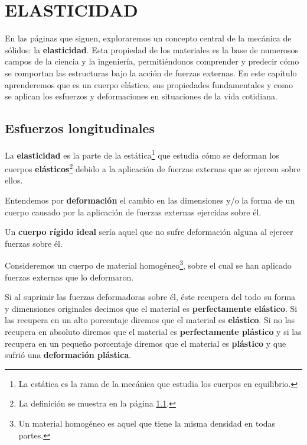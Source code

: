 \cleardoublepage
\chapter[Elasticidad]{ELASTICIDAD}
\startcontents
\printchaptertableofcontents

En las páginas que siguen, exploraremos un concepto central de la mecánica de sólidos: la \textbf{elasticidad}. Esta propiedad de los materiales es la base de numerosos campos de la ciencia y la ingeniería, permitiéndonos comprender y predecir cómo se comportan las estructuras bajo la acción de fuerzas externas. En este capítulo aprenderemos que es un cuerpo elástico, sus propiedades fundamentales y como se aplican los esfuerzos y deformaciones en situaciones de la vida cotidiana.

\section{Esfuerzos longitudinales}

La \textbf{elasticidad} es la parte de la estática\footnote{La estática es la rama de la mecánica que estudia los cuerpos en equilibrio.} que estudia cómo se deforman los cuerpos \textbf{elásticos}\footnote{La definición se muestra en la página \ref{}.} debido a la
aplicación de fuerzas externas que se ejercen sobre ellos.

\begin{definition}{}{}
    Entendemos por \textbf{deformación} el cambio en las dimensiones y/o la forma de un cuerpo causado por la aplicación de fuerzas externas ejercidas sobre él.
\end{definition}

Un \textbf{cuerpo rígido ideal} sería aquel que no sufre deformación alguna al ejercer fuerzas sobre él.

Consideremos un cuerpo de material homogéneo\footnote{Un material homogéneo es aquel que tiene la misma densidad en todas partes.}, sobre el cual se han aplicado fuerzas externas que lo deformaron.

Si al suprimir las fuerzas deformadoras sobre él, éste recupera del todo su forma y dimensiones originales decimos que el material es \textbf{perfectamente elástico}. Si las recupera en un alto porcentaje diremos que el material es \textbf{elástico}. Si no las recupera en absoluto diremos que el material es \textbf{perfectamente plástico} y si las recupera en un pequeño porcentaje diremos que el material es \textbf{plástico} y que sufrió una \textbf{deformación plástica}.


